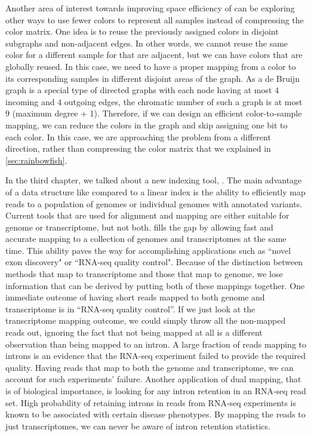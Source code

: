 Another area of interest towards improving space efficiency of \cdbgs can be exploring other ways to use fewer colors to represent all samples instead of compressing the color matrix. One idea is to reuse the previously assigned colors in disjoint subgraphs and non-adjacent edges. In other words, we cannot reuse the same color for a different sample for \kmers that are adjacent, but we can have colors that are globally reused. In this case, we need to have a proper mapping from a color to its corresponding samples in different disjoint areas of the graph. As a de Bruijn graph is a special type of directed graphs with each node having at most $4$ incoming and $4$ outgoing edges, the chromatic number of such a graph is at most $9$ (maximum degree + 1). Therefore, if we can design an efficient color-to-sample mapping, we can reduce the colors in the graph and skip assigning one bit to each color. In this case, we are approaching the problem from a different direction, rather than compressing the color matrix that we explained in \ref{sec:rainbowfish}.

In the third chapter, we talked about a new indexing tool, \pufferfish. The main advantage of a data structure like \pufferfish compared to a linear index is the ability to efficiently map reads to a population of genomes or individual genomes with annotated variants. Current tools that are used for alignment and mapping are either suitable for genome or transcriptome, but not both. \pufferfish fills the gap by allowing fast and accurate mapping to a collection of genomes and transcriptomes at the same time. This ability paves the way for accomplishing applications such as ``novel exon discovery" or ``RNA-seq quality control". 
Because of the distinction between methods that map to transcriptome and those that map to genome, we lose information that can be derived by putting both of these mappings together. One immediate outcome of having short reads mapped to both genome and transcriptome is in ``RNA-seq quality control''. If we just look at the transcriptome mapping outcome, we could simply throw all the non-mapped reads out, ignoring the fact that not being mapped at all is a different observation than being mapped to an intron. A large fraction of reads mapping to introns is an evidence that the RNA-seq experiment failed to provide the required quality. Having reads that map to both the genome and transcriptome, we can account for such experiments' failure. Another application of dual mapping, that is of biological importance, is looking for any intron retention in an RNA-seq read set. High probability of retaining introns in reads from RNA-seq experiments is known to be associated with certain disease phenotypes. By mapping the reads to just transcriptomes, we can never be aware of intron retention statistics.

